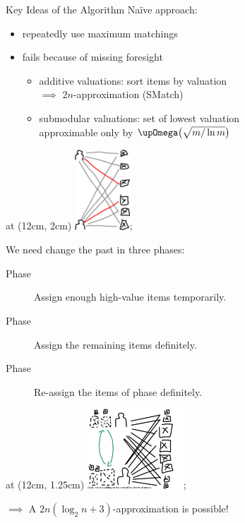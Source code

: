 \begin{frame}{Key Ideas of the Algorithm}
	Naïve approach:
	\adjustfortopitem
	\begin{itemize}
		\item
		repeatedly use maximum matchings

		\item
		fails because of missing foresight
		\adjustfortopitem
		\begin{itemize}
			\item
			additive valuations:
			sort items by valuation \\
			\(\!\implies\) \(2n\)-approximation (SMatch)

			\item
			submodular valuations:
			set of lowest valuation \\
			approximable only by \(\bigomega\paren[\big]{ \sqrt{m/\ln m} }\) \smash{\raisebox{-.25ex}{\Large\Lightning}}
		\end{itemize}
	\end{itemize}
	\beamerimage at (12cm, 2cm) {\includegraphics[height=3cm]{img/repeatedmatching}};

	\vspace{-1ex}
	We need change the past in three phases:
	\begin{description}
		\item[Phase \phasei]
		Assign enough high-value items temporarily.

		\item[Phase \phaseii]
		Assign the remaining items definitely.

		\item[Phase \phaseiii]
		Re-assign the items of phase \phasei{} definitely.
	\end{description}
	\beamerimage at (12cm, 1.25cm) {\includegraphics[height=3cm]{img/phases}};
	\vspace{0.5ex}
	\begin{minipage}{0.575\textwidth}
		\begin{exampleblock}{}
			\(\implies\) A \(2n (\log_2 n + 3)\)-approximation is possible!
		\end{exampleblock}
	\end{minipage}
\end{frame}

